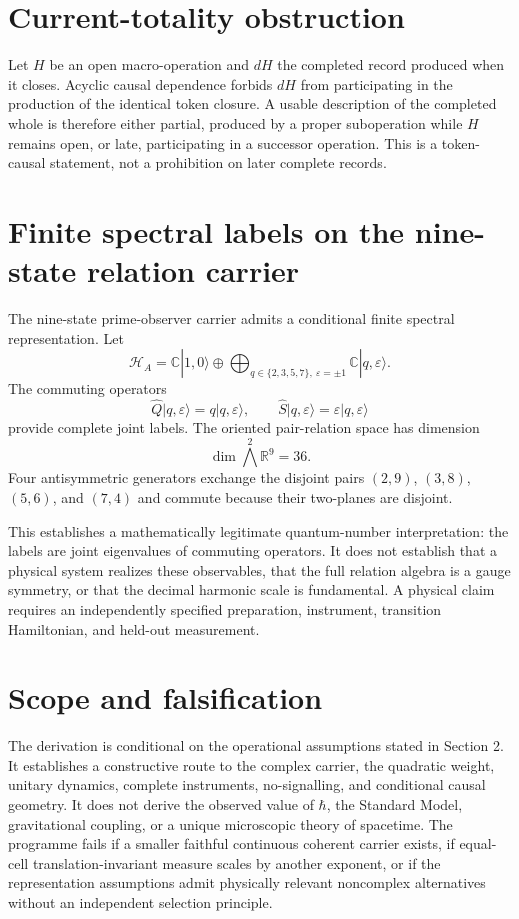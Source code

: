 \documentclass[11pt,a4paper]{article}
\begin{document}
\section{Current-totality obstruction}
Let $H$ be an open macro-operation and $dH$ the completed record produced when it closes. Acyclic causal dependence forbids $dH$ from participating in the production of the identical token closure. A usable description of the completed whole is therefore either partial, produced by a proper suboperation while $H$ remains open, or late, participating in a successor operation. This is a token-causal statement, not a prohibition on later complete records.

\section{Finite spectral labels on the nine-state relation carrier}
The nine-state prime-observer carrier admits a conditional finite spectral representation. Let
\begin{equation}
\mathcal H_A=\mathbb C|1,0\rangle\oplus\bigoplus_{q\in\{2,3,5,7\},\ \varepsilon=\pm1}\mathbb C|q,\varepsilon\rangle.
\end{equation}
The commuting operators
\begin{equation}
\widehat Q|q,\varepsilon\rangle=q|q,\varepsilon\rangle,
\qquad
\widehat S|q,\varepsilon\rangle=\varepsilon|q,\varepsilon\rangle
\end{equation}
provide complete joint labels. The oriented pair-relation space has dimension
\begin{equation}
\dim\bigwedge^2\mathbb R^9=36.
\end{equation}
Four antisymmetric generators exchange the disjoint pairs $(2,9)$, $(3,8)$, $(5,6)$, and $(7,4)$ and commute because their two-planes are disjoint.

This establishes a mathematically legitimate quantum-number interpretation: the labels are joint eigenvalues of commuting operators. It does not establish that a physical system realizes these observables, that the full relation algebra is a gauge symmetry, or that the decimal harmonic scale is fundamental. A physical claim requires an independently specified preparation, instrument, transition Hamiltonian, and held-out measurement.

\section{Scope and falsification}
The derivation is conditional on the operational assumptions stated in Section 2. It establishes a constructive route to the complex carrier, the quadratic weight, unitary dynamics, complete instruments, no-signalling, and conditional causal geometry. It does not derive the observed value of $\hbar$, the Standard Model, gravitational coupling, or a unique microscopic theory of spacetime. The programme fails if a smaller faithful continuous coherent carrier exists, if equal-cell translation-invariant measure scales by another exponent, or if the representation assumptions admit physically relevant noncomplex alternatives without an independent selection principle.
\end{document}
